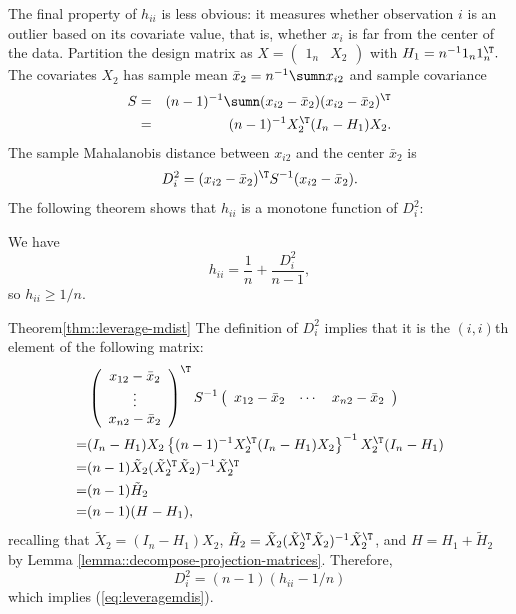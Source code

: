 The final property of $h_{ii}$ is less obvious: it measures whether
observation $i$ is an outlier based on its covariate value, that
is, whether $x_{i}$ is far from the center of the data. Partition the
design matrix as $X=\left(\begin{array}{cc}
1_{n} & X_{2}\end{array}\right)$ with $H_{1}=n^{-1}1_{n}1_{n}^{\T}.$ The covariates $X_{2}$ has sample mean $\bar{x}_{2}=n^{-1}\sumn x_{i2}$ and sample covariance 
\begin{eqnarray*}
S  
&=&  (n-1)^{-1}\sumn(x_{i2}-\bar{x}_{2})(x_{i2}-\bar{x}_{2})^{\T} \\
&=& (n-1)^{-1}X_{2}^{\T}(I_{n}-H_{1})X_{2}.
\end{eqnarray*}
The sample Mahalanobis distance between $x_{i2}$ and the center $\bar{x}_{2}$
is 
\[
D_{i}^{2}=(x_{i2}-\bar{x}_{2})^{\T}S^{-1}(x_{i2}-\bar{x}_{2}).
\]
The following theorem shows that $h_{ii}$ is a monotone function
of $D_{i}^{2}$:

\begin{theorem}\label{thm::leverage-mdist}
We have 
\begin{equation}
 h_{ii}= \frac{1}{n} + \frac{D_{i}^{2}}{n-1}  ,\label{eq:leveragemdis}
\end{equation}
so $h_{ii} \geq 1/n$. 
\end{theorem}


\begin{myproof}{Theorem}{\ref{thm::leverage-mdist}}
The definition of $D_{i}^{2}$ implies that it is the $(i,i)$th element
of the following matrix:
\begin{align*}
 & \left(\begin{array}{c}
x_{12}-\bar{x}_{2}\\
\vdots\\
x_{n2}-\bar{x}_{2}
\end{array}\right)^{\T}S^{-1}\left(\begin{array}{ccc}
x_{12}-\bar{x}_{2} & \cdots & x_{n2}-\bar{x}_{2}\end{array}\right)\\
= & (I_{n}-H_{1})X_{2}\left\{ (n-1)^{-1}X_{2}^{\T}(I_{n}-H_{1})X_{2}\right\} ^{-1}X_{2}^{\T}(I_{n}-H_{1})\\
= &(n-1)\tilde{X}_{2}(\tilde{X}_{2}^{\T}\tilde{X}_{2})^{-1}\tilde{X}_{2}^{\T}\\
= &(n-1)\tilde{H}_{2}\\
= &(n-1)(H-H_{1}),
\end{align*}
recalling that $\tilde{X}_2 = (I_n - H_1) X_2$, $\tilde{H}_2 = \tilde{X}_2 (\tilde{X}_2^{\T} \tilde{X}_2)^{-1} \tilde{X}_2^{\T}$, and $H = H_1 + \tilde{H}_{2}$ by Lemma \ref{lemma::decompose-projection-matrices}. 
Therefore, 
\[
D_{i}^{2}=(n-1) (h_{ii}-1/n)
\]
which implies (\ref{eq:leveragemdis}).
\end{myproof}




